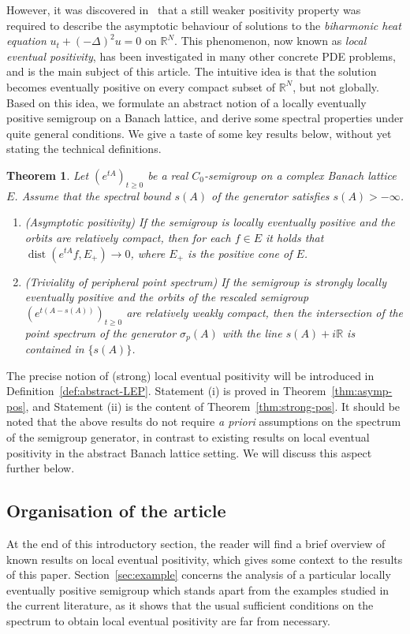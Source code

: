 \documentclass[a4paper, reqno]{amsart}
\numberwithin{equation}{section}
\theoremstyle{plain}
\newtheorem{theorem}{Theorem}[section]
\theoremstyle{definition}
\theoremstyle{remark}
\DeclareMathOperator{\dist}{dist}
\newcommand{\RR}{\mathbb{R}}
\begin{document}
However, it was discovered in~\cite{GG-lep} that a still weaker positivity property was required to describe the asymptotic behaviour of solutions to the \emph{biharmonic heat equation} $u_t + (-\Delta)^2 u=0$ on $\RR^N$. This phenomenon, now known as \emph{local eventual positivity}, has been investigated in many other concrete PDE problems, and is the main subject of this article. The intuitive idea is that the solution becomes eventually positive on every compact subset of $\RR^N$, but not globally. Based on this idea, we formulate an abstract notion of a locally eventually positive semigroup on a Banach lattice, and derive some spectral properties under quite general conditions. We give a taste of some key results below, without yet stating the technical definitions.
\begin{theorem}
	\label{thm:LEP-intro}
	Let $(e^{tA})_{t\ge 0}$ be a real $C_0$-semigroup on a complex Banach lattice $E$. Assume that the spectral bound $s(A)$ of the generator satisfies $s(A)>-\infty$.
	\begin{enumerate}[\upshape(i)]
		\item \emph{(Asymptotic positivity)} If the semigroup is locally eventually positive and the orbits are relatively compact, then for each $f\in E$ it holds that $\dist(e^{tA}f, E_+) \to 0$, where $E_+$ is the positive cone of $E$.
		\item \emph{(Triviality of peripheral point spectrum)} If the semigroup is strongly locally eventually positive and the orbits of the rescaled semigroup $(e^{t(A-s(A))})_{t\ge 0}$ are relatively weakly compact, then the intersection of the point spectrum of the generator $\sigma_p(A)$ with the line $s(A)+i\RR$ is contained in $\{s(A)\}$.
	\end{enumerate}
\end{theorem}
The precise notion of (strong) local eventual positivity will be introduced in Definition~\ref{def:abstract-LEP}. Statement (i) is proved in Theorem~\ref{thm:asymp-pos}, and Statement (ii) is the content of Theorem~\ref{thm:strong-pos}. It should be noted that the above results do not require \emph{a priori} assumptions on the spectrum of the semigroup generator, in contrast to existing results on local eventual positivity in the abstract Banach lattice setting. We will discuss this aspect further below.

\subsection*{Organisation of the article}
At the end of this introductory section, the reader will find a brief overview of known results on local eventual positivity, which gives some context to the results of this paper. Section~\ref{sec:example} concerns the analysis of a particular locally eventually positive semigroup which stands apart from the examples studied in the current literature, as it shows that the usual sufficient conditions on the spectrum to obtain local eventual positivity are far from necessary.
\end{document}

